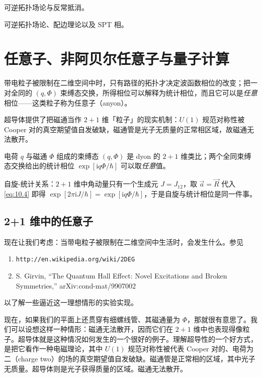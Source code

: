 可逆拓扑场论与反常抵消。

可逆拓扑场论、配边理论以及 SPT 相。

\section{任意子、非阿贝尔任意子与量子计算} %

\begin{keytakeaways}
  \item 带电粒子被限制在二维空间中时，只有路径的拓扑才决定波函数相位的改变；把一对全同的 $(q,\Phi)$ 束缚态交换，所得相位可以解释为统计相位，而且它可以是\emph{任意}相位——这类粒子称为任意子（anyon）。
  \item 超导体提供了把磁通当作 $2+1$ 维「粒子」的现实机制：$U(1)$ 规范对称性被 Cooper 对的真空期望值自发破缺，磁通管是光子无质量的正常相区域，故磁通无法散开。
  \item 电荷 $q$ 与磁通 $\Phi$ 组成的束缚态 $(q,\Phi)$ 是 dyon 的 $2+1$ 维类比；两个全同束缚态交换给出的统计相位 $\exp[\mathrm{i}q\Phi/\hbar]$ 可以取\emph{任意}值。
  \item 自旋-统计关系：$2+1$ 维中角动量只有一个生成元 $J=J_{12}$，取 $\vec a=\vec R$ 代入 \eqref{eq:10.4} 即得 $\exp[2\pi\mathrm{i}J/\hbar]=\exp[\mathrm{i}q\Phi/\hbar]$，于是自旋与统计相位是同一件事。
\end{keytakeaways}

\subsection{2+1 维中的任意子} %

现在让我们考虑：当带电粒子被限制在二维空间中生活时，会发生什么。参见
\begin{enumerate}
  \item \texttt{http://en.wikipedia.org/wiki/2DEG}
  \item S. Girvin, ``The Quantum Hall Effect: Novel Excitations and Broken Symmetries,'' arXiv:cond-mat/9907002
\end{enumerate}
以了解一些逼近这一理想情形的实验实现。

现在，如果我们的平面上还贯穿有细螺线管、其磁通量为 $\Phi$，那就很有意思了。我们可以设想这样一种情形：磁通无法散开，因而它们在 $2+1$ 维中也表现得像粒子。超导体就是这种情况如何发生的一个很好的例子。理解超导性的一个好方式，是把它看作一种电磁理论，其中 $U(1)$ 规范对称性被代表 Cooper 对的、电荷为二（charge two）的场的真空期望值自发破缺。磁通管是正常相的区域，其中光子无质量。超导体则是光子获得质量的区域。磁通无法散开。

